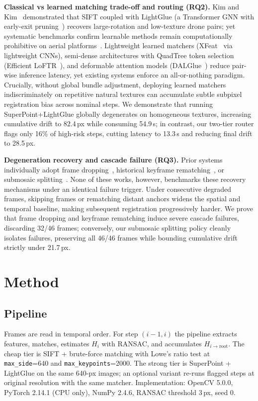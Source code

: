 \documentclass[conference]{IEEEtran}
\begin{document}
\textbf{Classical vs learned matching trade-off and routing (RQ2).} Kim and
Kim~\cite{kim2025} demonstrated that SIFT coupled with LightGlue (a Transformer GNN
with early-exit pruning~\cite{lindenberger2023}) recovers large-rotation and
low-texture drone pairs; yet systematic benchmarks confirm learnable methods remain
computationally prohibitive on aerial platforms~\cite{gaisbauer2025}. Lightweight
learned matchers (XFeat~\cite{potlapalli2024} via lightweight CNNs), semi-dense
architectures with QuadTree token selection (Efficient LoFTR~\cite{wang2024}), and
deformable attention models (DALGlue~\cite{dalglue}) reduce pair-wise inference
latency, yet existing systems enforce an all-or-nothing paradigm. Crucially,
without global bundle adjustment, deploying learned matchers indiscriminately on
repetitive natural textures can accumulate subtle subpixel registration bias across
nominal steps. We demonstrate that running SuperPoint+LightGlue globally degenerates
on homogeneous textures, increasing cumulative drift to 82.4\,px while consuming
54.9\,s; in contrast, our two-tier router flags only 16\% of high-risk steps, cutting
latency to 13.3\,s and reducing final drift to 28.5\,px.

\textbf{Degeneration recovery and cascade failure (RQ3).} Prior systems
individually adopt frame dropping~\cite{hwang2026}, historical keyframe
rematching~\cite{li2023}, or submosaic splitting~\cite{dronezaic}. None of these
works, however, benchmarks these recovery mechanisms under an identical failure
trigger. Under consecutive degraded frames, skipping frames or rematching distant
anchors widens the spatial and temporal baseline, making subsequent registration
progressively harder. We prove that frame dropping and keyframe rematching induce
severe cascade failures, discarding 32/46 frames; conversely, our submosaic
splitting policy cleanly isolates failures, preserving all 46/46 frames while
bounding cumulative drift strictly under 21.7\,px.
\section{Method}
\subsection{Pipeline}
Frames are read in temporal order. For step $(i-1,i)$ the pipeline extracts
features, matches, estimates $H_i$ with RANSAC, and accumulates
$H_{i\to \mathrm{root}}$. The cheap tier is SIFT + brute-force matching with
Lowe's ratio test at \texttt{max\_side}=640 and
\texttt{max\_keypoints}=2000. The strong tier is SuperPoint + LightGlue on the
same 640-px images; an optional variant re-runs flagged steps at original
resolution with the same matcher. Implementation: OpenCV 5.0.0, PyTorch
2.14.1 (CPU only), NumPy 2.4.6, RANSAC threshold 3\,px, seed 0.
\end{document}
